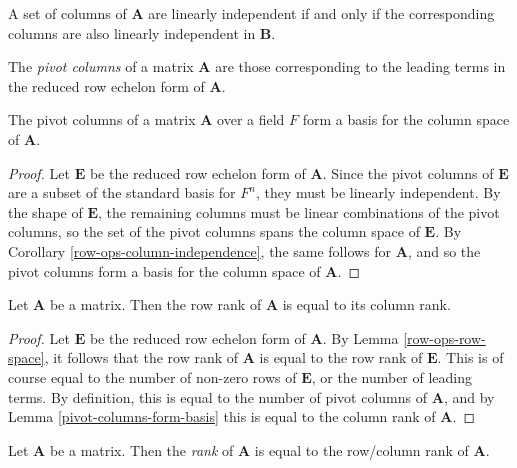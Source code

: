 \begin{cor}\label{row-ops-column-independence}
    A set of columns of $\boldsymbol{A}$ are linearly independent if and only if the corresponding columns are also linearly independent in $\boldsymbol{B}$.
\end{cor}

\begin{defn}
    The \emph{pivot columns} of a matrix $\boldsymbol{A}$ are those corresponding to the leading terms in the reduced row echelon form of $\boldsymbol{A}$.
\end{defn}

\begin{lemma}\label{pivot-columns-form-basis}
    The pivot columns of a matrix $\boldsymbol{A}$ over a field $F$ form a basis for the column space of $\boldsymbol{A}$.
\end{lemma}

\begin{proof}
    Let $\boldsymbol{E}$ be the reduced row echelon form of $\boldsymbol{A}$. Since the pivot columns of $\boldsymbol{E}$ are a subset of the standard basis for $F^n$, they must be linearly independent. By the shape of $\boldsymbol{E}$, the remaining columns must be linear combinations of the pivot columns, so the set of the pivot columns spans the column space of $\boldsymbol{E}$. By Corollary \ref{row-ops-column-independence}, the same follows for $\boldsymbol{A}$, and so the pivot columns form a basis for the column space of $\boldsymbol{A}$.
\end{proof}

\begin{thm}\label{row-column-rank-equivalence}
    Let $\boldsymbol{A}$ be a matrix. Then the row rank of $\boldsymbol{A}$ is equal to its column rank.
\end{thm}

\begin{proof}
    Let $\boldsymbol{E}$ be the reduced row echelon form of $\boldsymbol{A}$. By Lemma \ref{row-ops-row-space}, it follows that the row rank of $\boldsymbol{A}$ is equal to the row rank of $\boldsymbol{E}$. This is of course equal to the number of non-zero rows of $\boldsymbol{E}$, or the number of leading terms. By definition, this is equal to the number of pivot columns of $\boldsymbol{A}$, and by Lemma \ref{pivot-columns-form-basis} this is equal to the column rank of $\boldsymbol{A}$.
\end{proof}

\begin{defn}
    Let $\boldsymbol{A}$ be a matrix. Then the \emph{rank} of $\boldsymbol{A}$ is equal to the row/column rank of $\boldsymbol{A}$.
\end{defn}

